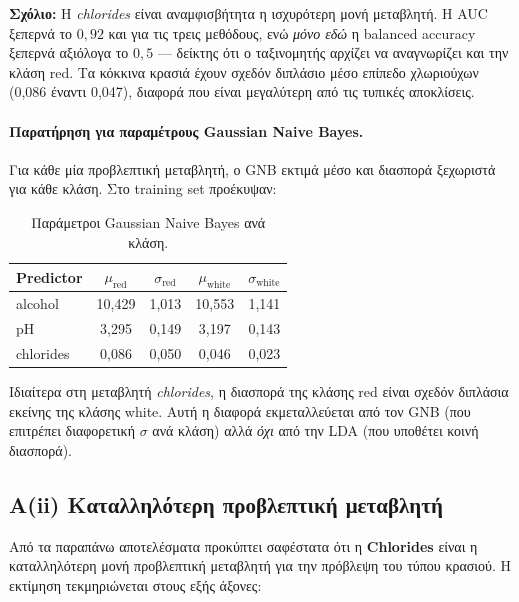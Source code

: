 \documentclass[11pt,a4paper]{article}
\begin{document}
\noindent
\textbf{Σχόλιο:} Η \textit{chlorides} είναι αναμφισβήτητα η ισχυρότερη μονή
μεταβλητή. Η AUC ξεπερνά το $0{,}92$ και για τις τρεις μεθόδους, ενώ
\emph{μόνο εδώ} η balanced accuracy ξεπερνά αξιόλογα το $0{,}5$ — δείκτης
ότι ο ταξινομητής αρχίζει να αναγνωρίζει και την κλάση red. Τα κόκκινα
κρασιά έχουν σχεδόν διπλάσιο μέσο επίπεδο χλωριούχων (0,086 έναντι
0,047), διαφορά που είναι μεγαλύτερη από τις τυπικές αποκλίσεις.

\paragraph{Παρατήρηση για παραμέτρους Gaussian Naive Bayes.}
Για κάθε μία προβλεπτική μεταβλητή, ο GNB εκτιμά μέσο και διασπορά
ξεχωριστά για κάθε κλάση. Στο training set προέκυψαν:

\begin{table}[h!]
\centering
\caption{Παράμετροι Gaussian Naive Bayes ανά κλάση.}
\begin{tabular}{lcccc}
\toprule
Predictor & $\mu_{\text{red}}$ & $\sigma_{\text{red}}$ &
            $\mu_{\text{white}}$ & $\sigma_{\text{white}}$ \\
\midrule
alcohol   & 10,429 & 1,013 & 10,553 & 1,141 \\
pH        & 3,295  & 0,149 & 3,197  & 0,143 \\
chlorides & 0,086  & 0,050 & 0,046  & 0,023 \\
\bottomrule
\end{tabular}
\end{table}

Ιδιαίτερα στη μεταβλητή \textit{chlorides}, η διασπορά της κλάσης red
είναι σχεδόν διπλάσια εκείνης της κλάσης white. Αυτή η διαφορά εκμεταλλεύεται
από τον GNB (που επιτρέπει διαφορετική $\sigma$ ανά κλάση) αλλά \emph{όχι}
από την LDA (που υποθέτει κοινή διασπορά).

\subsection{Α(ii) Καταλληλότερη προβλεπτική μεταβλητή}

Από τα παραπάνω αποτελέσματα προκύπτει σαφέστατα ότι η \textbf{Chlorides}
είναι η καταλληλότερη μονή προβλεπτική μεταβλητή για την πρόβλεψη του τύπου
κρασιού. Η εκτίμηση τεκμηριώνεται στους εξής άξονες:
\end{document}
